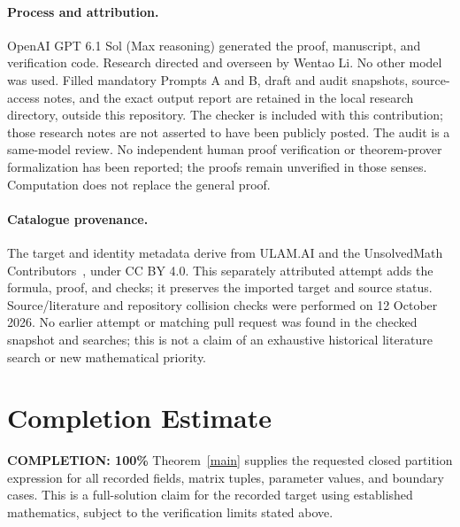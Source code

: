 \documentclass[11pt]{article}
\begin{document}
\paragraph{Process and attribution.}
OpenAI GPT 6.1 Sol (Max reasoning) generated the proof, manuscript, and
verification code. Research directed and overseen by Wentao Li.
No other model was used. Filled mandatory Prompts A and B, draft and audit
snapshots, source-access notes, and the exact output report are retained in
the local research directory,
outside this repository. The checker is included with this contribution;
those research notes are not asserted to have been publicly posted.
The audit is a same-model review. No independent human proof verification
or theorem-prover formalization has been reported; the proofs remain
unverified in those senses. Computation does not replace the general proof.

\paragraph{Catalogue provenance.}
The target and identity metadata derive from ULAM.AI and the UnsolvedMath
Contributors~\cite{catalogue}, under CC BY 4.0. This separately attributed
attempt adds the formula, proof, and checks; it preserves the imported
target and source status. Source/literature and repository collision checks
were performed on 12 October 2026. No earlier attempt or matching pull
request was found in the checked snapshot and searches; this is not a claim
of an exhaustive historical literature search or new mathematical priority.

\section{Completion Estimate}
\noindent\textbf{COMPLETION: 100\%}
Theorem~\ref{main} supplies the requested closed partition expression for
all recorded fields, matrix tuples, parameter values, and boundary cases.
This is a full-solution claim for the recorded target using established
mathematics, subject to the verification limits stated above.
\end{document}
